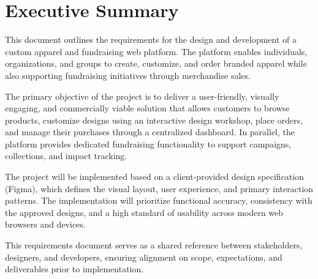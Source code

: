\section{Executive Summary}

This document outlines the requirements for the design and development of a
custom apparel and fundraising web platform. The platform enables individuals,
organizations, and groups to create, customize, and order branded apparel while
also supporting fundraising initiatives through merchandise sales.

The primary objective of the project is to deliver a user-friendly, visually
engaging, and commercially viable solution that allows customers to browse
products, customize designs using an interactive design workshop, place orders,
and manage their purchases through a centralized dashboard. In parallel, the
platform provides dedicated fundraising functionality to support campaigns,
collections, and impact tracking.

The project will be implemented based on a client-provided design specification
(Figma), which defines the visual layout, user experience, and primary interaction
patterns. The implementation will prioritize functional accuracy, consistency
with the approved designs, and a high standard of usability across modern web
browsers and devices.

This requirements document serves as a shared reference between stakeholders,
designers, and developers, ensuring alignment on scope, expectations, and
deliverables prior to implementation.
